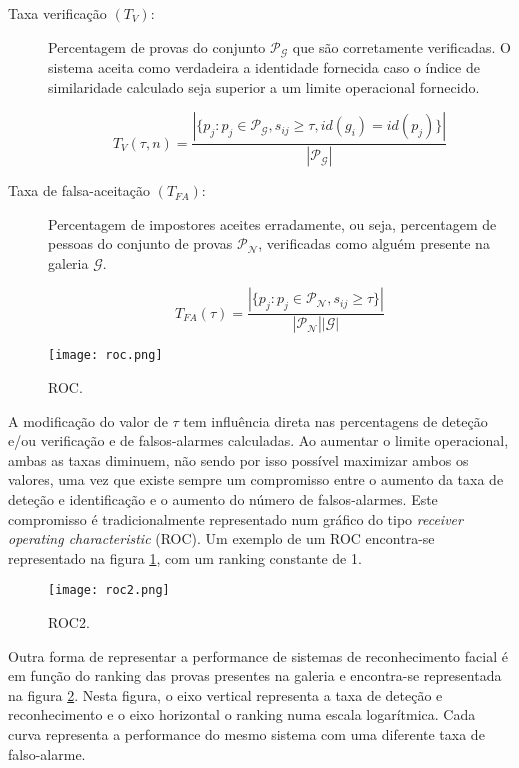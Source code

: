 \begin{description}
 \item[Taxa verificação $(T_{V})$:] Percentagem de provas do conjunto $\mathscr{P}_\mathscr{G}$ que são corretamente verificadas. O sistema aceita como verdadeira a identidade fornecida caso o índice de similaridade calculado seja superior a um  limite operacional fornecido.

\begin{equation}
 T_{V}(\tau, n) = \frac{|\{p_j:p_j \in \mathscr{P}_\mathscr{G}, s_{ij} \geqslant \tau, id(g_i)=id(p_j)\}|}{|\mathscr{P}_\mathscr{G}|}
\end{equation}

  \item[Taxa de falsa-aceitação $(T_{FA})$:] Percentagem de impostores aceites erradamente, ou seja, percentagem de pessoas do conjunto de provas $\mathscr{P}_\mathscr{N}$, verificadas como alguém presente na galeria $\mathscr{G}$.
  
\begin{equation}
 T_{FA}(\tau) = \frac{|\{p_j:p_j \in \mathscr{P}_\mathscr{N}, s_{ij} \geqslant \tau\}|}{|\mathscr{P}_\mathscr{N}||\mathscr{G}|}
\end{equation}
\end{description}

\begin{figure}[ht]
  \begin{center}
    \leavevmode
    \texttt{[image: roc.png]}
    \caption{ROC.}	
    \label{fig:roc}
  \end{center}
\end{figure}
A modificação do valor de $\tau$ tem influência direta nas percentagens de deteção e/ou verificação e de falsos-alarmes calculadas. Ao aumentar o limite operacional, ambas as taxas diminuem, não sendo por isso possível maximizar ambos os valores, uma vez que existe sempre um compromisso entre o aumento da taxa de deteção e identificação e o aumento do número de falsos-alarmes. Este compromisso é tradicionalmente representado num gráfico do tipo \textit{receiver operating characteristic} (ROC). Um exemplo de um ROC encontra-se representado na figura \ref{fig:roc}, com um ranking constante de 1. 

\begin{figure}[ht]
  \begin{center}
    \leavevmode
    \texttt{[image: roc2.png]}
    \caption{ROC2.}	
    \label{fig:roc2}
  \end{center}
\end{figure}
Outra forma de representar a performance de sistemas de reconhecimento facial é em função do ranking das provas presentes na galeria e encontra-se representada na figura \ref{fig:roc2}. Nesta figura, o eixo vertical representa a taxa de deteção e reconhecimento e o eixo horizontal o ranking numa escala logarítmica. Cada curva representa a performance do mesmo sistema com uma diferente taxa de falso-alarme.

